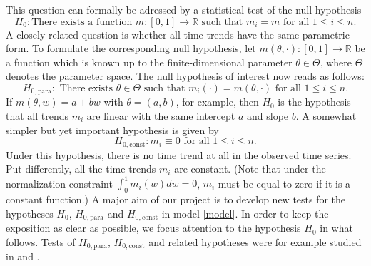 \documentclass[a4paper,12pt]{article}
\begin{document}
This question can formally be adressed by a statistical test of the null hypothesis 
\[ H_0: \text{There exists a function } m: [0,1] \rightarrow \mathbb{R} \text{ such that } m_i = m  \text{ for all } 1 \le i \le n. \]
A closely related question is whether all time trends have the same parametric form. To formulate the corresponding null hypothesis, let $m(\theta,\cdot): [0,1] \rightarrow \mathbb{R}$ be a function which is known up to the finite-dimensional parameter $\theta \in \Theta$, where $\Theta$ denotes the parameter space. The null hypothesis of interest now reads as follows:  
\[ H_{0,\text{para}}: \text{ There exists } \theta \in \Theta \text{ such that } m_i(\cdot) = m(\theta,\cdot) \text{ for all } 1 \le i \le n. \]  
If $m(\theta,w) = a + b w$ with $\theta = (a,b)$, for example, then $H_0$ is the hypothesis that all trends $m_i$ are linear with the same intercept $a$ and slope $b$. A somewhat simpler but yet important hypothesis is given by 
\[ H_{0,\text{const}}: m_i \equiv 0 \text{ for all } 1 \le i \le n. \]
Under this hypothesis, there is no time trend at all in the observed time series. Put differently, all the time trends $m_i$ are constant. (Note that under the normalization constraint $\int_0^1 m_i(w) dw = 0$, $m_i$ must be equal to zero if it is a constant function.) A major aim of our project is to develop new tests for the hypotheses $H_0$, $H_{0,\text{para}}$ and $H_{0,\text{const}}$ in model \eqref{model}. In order to keep the exposition as clear as possible, we focus attention to the hypothesis $H_0$ in what follows. Tests of $H_{0,\text{para}}$, $H_{0,\text{const}}$ and related hypotheses were for example studied in \cite{Lyubchich2016} and \cite{ChenWu2018}. 
\end{document}

